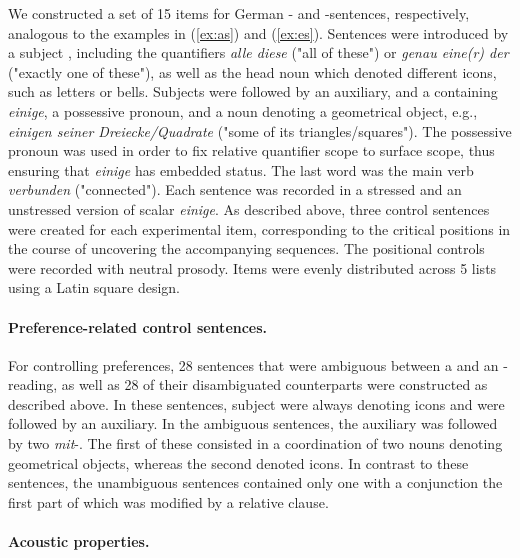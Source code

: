 \documentclass[fleqn,reqno,10pt,draft]{article}
\newcommand{\as}{\acro{as}}
\renewcommand{\es}{\acro{es}}
\newcommand{\lc}{\acro{lc}}
\newcommand{\ec}{\acro{ec}}
\begin{document}
We constructed a set of 15 items for German \as- and \es-sentences,
respectively, analogous to the examples in (\ref{ex:as}) and
(\ref{ex:es}). Sentences were introduced by a subject {},
including the quantifiers {\it alle diese} ("all of these") or {\it
  genau eine(r) der} ("exactly one of these"), as well as the head
noun which denoted different icons, such as letters or bells. Subjects
were followed by an auxiliary, and a  containing {\it
  einige}, a possessive pronoun, and a noun denoting a geometrical
object, e.g., {\it einigen seiner Dreiecke/Quadrate} ("some of its
triangles/squares"). The possessive pronoun was used in order to fix
relative quantifier scope to surface scope, thus ensuring that {\it
  einige} has embedded status. The last word was the main verb {\it
  verbunden} ("connected").  Each sentence was recorded in a stressed
and an unstressed version of scalar {\it einige}. As described above,
three control sentences were created for each experimental item,
corresponding to the critical positions in the course of uncovering
the accompanying sequences.  The positional controls were recorded
with neutral prosody.  Items were evenly distributed across 5 lists
using a Latin square design.


\paragraph{Preference-related control sentences.}
For controlling preferences, 28 sentences that were ambiguous between
a \lc and an \ec-reading, as well as 28 of their
disambiguated counterparts were constructed as described above. In
these sentences, subject  were always denoting icons and
were followed by an auxiliary. In the ambiguous sentences, the
auxiliary was followed by two {\it mit}-.  The first of
these  consisted in a coordination of two nouns denoting
geometrical objects, whereas the second  denoted icons. In
contrast to these sentences, the unambiguous sentences contained only
one  with a conjunction the first part of which was modified
by a relative clause.

\paragraph{Acoustic properties.}
\end{document}
